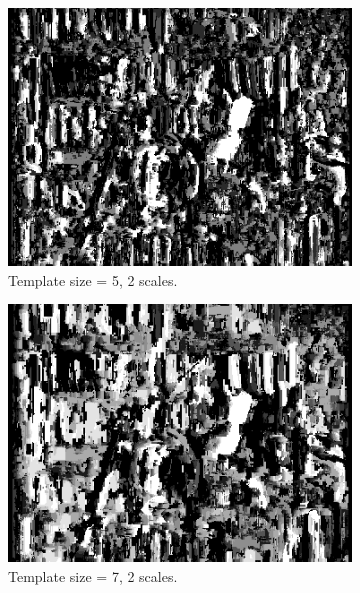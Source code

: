 \documentclass[12pt,a4paper,oneside,final]{article}
\begin{document}
\begin{table}[H]
\begin{subtable}{1\textwidth}
\begin{figure}[H]
\begin{subfigure}[b]{0.24\textwidth}
			\includegraphics[width=\textwidth]{disparity_s2_k5set_1.png}
			\caption{Template size = 5, 2 scales.}
		\end{subfigure}
		\begin{subfigure}[b]{0.24\textwidth}
			\includegraphics[width=\textwidth]{disparity_s2_k7set_1.png}
			\caption{Template size = 7, 2 scales.}
		\end{subfigure}
		\begin{subfigure}[b]{0.24\textwidth}

\end{subfigure}
\end{figure}
\end{subtable}
\end{table}
\end{document}
